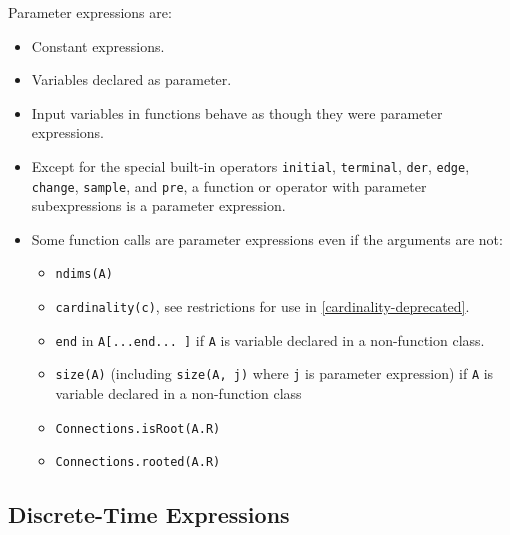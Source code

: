 Parameter expressions are:
\begin{itemize}
\item
  Constant expressions.
\item
  Variables declared as parameter.
\item
  Input variables in functions behave as though they were parameter expressions.
\item
  Except for the special built-in operators \lstinline!initial!, \lstinline!terminal!, \lstinline!der!,
  \lstinline!edge!, \lstinline!change!, \lstinline!sample!, and \lstinline!pre!, a function or operator with parameter
  subexpressions is a parameter expression.
\item
  Some function calls are parameter expressions even if the arguments
  are not:

  \begin{itemize}
  \item
    \lstinline!ndims(A)!
  \item
    \lstinline!cardinality(c)!, see restrictions for use in \autoref{cardinality-deprecated}.
  \item
    \lstinline!end! in \lstinline!A[...end... ]! if \lstinline!A! is variable declared in a  non-function class.
  \item
    \lstinline!size(A)! (including \lstinline!size(A, j)! where \lstinline!j! is parameter expression) if \lstinline!A!
    is variable declared in a non-function class
  \item
    \lstinline!Connections.isRoot(A.R)!
  \item
    \lstinline!Connections.rooted(A.R)!
  \end{itemize}
\end{itemize}

\subsection{Discrete-Time Expressions}

